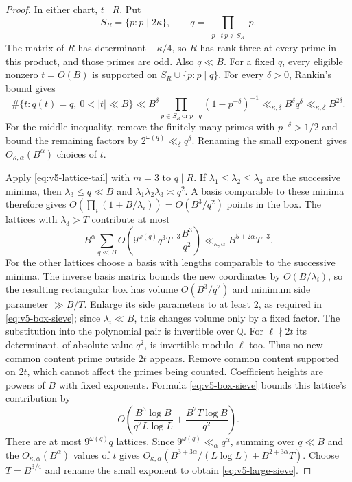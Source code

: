 \documentclass[11pt]{article}
\theoremstyle{definition}
\theoremstyle{remark}
\begin{document}
\begin{proof}
In either chart, $t\mid R$. Put
\[
 S_R=\{p:p\mid2\kappa\},\qquad
 q=\prod_{\substack{p\mid t\ p\notin S_R}}p.
\]
The matrix of $R$ has determinant $-\kappa/4$, so $R$ has rank three
at every prime in this product, and those primes are odd. Also $q\ll B$.
For a fixed $q$, every eligible nonzero $t=O(B)$ is supported on
$S_R\cup\{p:p\mid q\}$. For every $\delta>0$, Rankin's bound gives
\[
 \#\{t:q(t)=q,\ 0<|t|\ll B\}
 \ll B^\delta
   \prod_{p\in S_R\ \text{or}\ p\mid q}(1-p^{-\delta})^{-1}
 \ll_{\kappa,\delta} B^\delta q^\delta
 \ll_{\kappa,\delta} B^{2\delta}.
\]
For the middle inequality, remove the finitely many primes with
$p^{-\delta}>1/2$ and bound the remaining factors by $2^{\omega(q)}
\ll_\delta q^\delta$. Renaming the small exponent gives
$O_{\kappa,\alpha}(B^\alpha)$ choices of $t$.

Apply \eqref{eq:v5-lattice-tail} with $m=3$ to $q\mid R$.
If $\lambda_1\leq\lambda_2\leq\lambda_3$ are the successive minima,
then $\lambda_3\leq q\ll B$ and
$\lambda_1\lambda_2\lambda_3\asymp q^2$.
A basis comparable to these minima therefore gives
$O(\prod_i(1+B/\lambda_i))=O(B^3/q^2)$ points in the box.
The lattices with $\lambda_3>T$ contribute at most
\[
 B^\alpha\sum_{q\ll B}
 O\left(9^{\omega(q)}q^3T^{-3}\frac{B^3}{q^2}\right)
 \ll_{\kappa,\alpha} B^{5+2\alpha}T^{-3}.
\]
For the other lattices choose a basis with lengths comparable to the
successive minima. The inverse basis matrix bounds the new coordinates by
$O(B/\lambda_i)$, so the resulting rectangular box has volume
$O(B^3/q^2)$ and minimum side parameter $\gg B/T$.
Enlarge its side parameters to at least $2$, as required in
\eqref{eq:v5-box-sieve}; since $\lambda_i\ll B$, this changes volume
only by a fixed factor.
The substitution into the polynomial pair is invertible over $\mathbb Q$.
For $\ell\nmid2t$ its determinant, of absolute value $q^2$, is invertible
modulo $\ell$ too. Thus no new common content prime outside $2t$ appears.
Remove common content supported on $2t$, which cannot affect the primes
being counted. Coefficient heights are powers of $B$ with fixed exponents.
Formula \eqref{eq:v5-box-sieve} bounds this lattice's contribution by
\[
 O\left(\frac{B^3\log B}{q^2L\log L}
                 +\frac{B^2T\log B}{q^2}\right).
\]
There are at most $9^{\omega(q)}q$ lattices. Since
$9^{\omega(q)}\ll_\alpha q^\alpha$, summing over $q\ll B$ and the
$O_{\kappa,\alpha}(B^\alpha)$ values of $t$ gives
$O_{\kappa,\alpha}(B^{3+3\alpha}/(L\log L)+B^{2+3\alpha}T)$.
Choose $T=B^{3/4}$ and rename the small exponent to obtain
\eqref{eq:v5-large-sieve}.
\end{proof}
\end{document}

